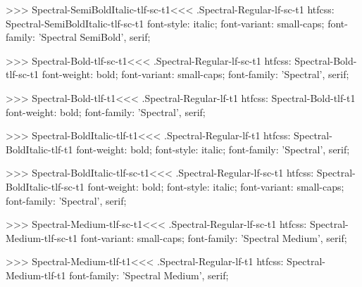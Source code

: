 >>>
\<Spectral-SemiBoldItalic-tlf-sc-t1\><<<
.Spectral-Regular-lf-sc-t1
htfcss:  Spectral-SemiBoldItalic-tlf-sc-t1  font-style: italic; font-variant: small-caps; font-family: 'Spectral SemiBold', serif;

>>>
\<Spectral-Bold-tlf-sc-t1\><<<
.Spectral-Regular-lf-sc-t1
htfcss:  Spectral-Bold-tlf-sc-t1  font-weight: bold; font-variant: small-caps; font-family: 'Spectral', serif;

>>>
\<Spectral-Bold-tlf-t1\><<<
.Spectral-Regular-lf-t1
htfcss:  Spectral-Bold-tlf-t1  font-weight: bold; font-family: 'Spectral', serif;

>>>
\<Spectral-BoldItalic-tlf-t1\><<<
.Spectral-Regular-lf-t1
htfcss:  Spectral-BoldItalic-tlf-t1  font-weight: bold; font-style: italic; font-family: 'Spectral', serif;

>>>
\<Spectral-BoldItalic-tlf-sc-t1\><<<
.Spectral-Regular-lf-sc-t1
htfcss:  Spectral-BoldItalic-tlf-sc-t1  font-weight: bold; font-style: italic; font-variant: small-caps; font-family: 'Spectral', serif;

>>>
\<Spectral-Medium-tlf-sc-t1\><<<
.Spectral-Regular-lf-sc-t1
htfcss:  Spectral-Medium-tlf-sc-t1  font-variant: small-caps; font-family: 'Spectral Medium', serif;

>>>
\<Spectral-Medium-tlf-t1\><<<
.Spectral-Regular-lf-t1
htfcss:  Spectral-Medium-tlf-t1  font-family: 'Spectral Medium', serif;

